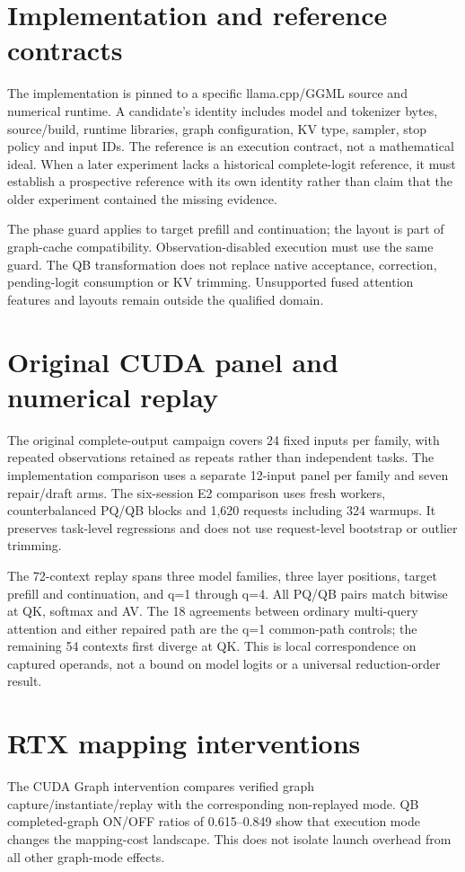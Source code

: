\section{Implementation and reference contracts}
\label{app:implementation}
The implementation is pinned to a specific llama.cpp/GGML source and numerical runtime. A candidate's identity includes model and tokenizer bytes, source/build, runtime libraries, graph configuration, KV type, sampler, stop policy and input IDs. The reference is an execution contract, not a mathematical ideal. When a later experiment lacks a historical complete-logit reference, it must establish a prospective reference with its own identity rather than claim that the older experiment contained the missing evidence.

The phase guard applies to target prefill and continuation; the layout is part of graph-cache compatibility. Observation-disabled execution must use the same guard. The QB transformation does not replace native acceptance, correction, pending-logit consumption or KV trimming. Unsupported fused attention features and layouts remain outside the qualified domain.

\section{Original CUDA panel and numerical replay}
\label{app:cuda}
The original complete-output campaign covers 24 fixed inputs per family, with repeated observations retained as repeats rather than independent tasks. The implementation comparison uses a separate 12-input panel per family and seven repair/draft arms. The six-session E2 comparison uses fresh workers, counterbalanced PQ/QB blocks and 1,620 requests including 324 warmups. It preserves task-level regressions and does not use request-level bootstrap or outlier trimming.

The 72-context replay spans three model families, three layer positions, target prefill and continuation, and q=1 through q=4. All PQ/QB pairs match bitwise at QK, softmax and AV. The 18 agreements between ordinary multi-query attention and either repaired path are the q=1 common-path controls; the remaining 54 contexts first diverge at QK. This is local correspondence on captured operands, not a bound on model logits or a universal reduction-order result.

\section{RTX mapping interventions}
\label{app:rtxmap}
The CUDA Graph intervention compares verified graph capture/instantiate/replay with the corresponding non-replayed mode. QB completed-graph ON/OFF ratios of 0.615--0.849 show that execution mode changes the mapping-cost landscape. This does not isolate launch overhead from all other graph-mode effects.

